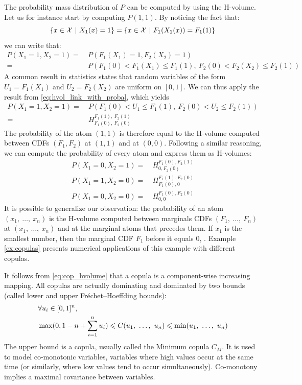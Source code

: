 \begin{example}
    The probability mass distribution of $P$ can be computed by using the H-volume. Let us for instance start by computing $P(1,1)$. By noticing the fact that:
    \begin{equation*}
        \{x\in\mathcal{X}~|~X_1(x)=1\}=\{x\in\mathcal{X}~|~F_1(X_1(x))=F_1(1)\}
    \end{equation*}
    we can write that:
    \begin{align*}
        P(X_1 = 1, X_2=1) =& ~P(F_1(X_1)= 1, F_2(X_2) = 1)\\
        =& ~P(F_1(0) < F_1(X_1)\leqslant F_1(1), ~F_2(0) < F_2(X_2)\leqslant F_2(1))
    \end{align*}
    A common result in statistics states that random variables of the form $U_1=F_1(X_1)$ and $U_2=F_2(X_2)$ are uniform on $[0,1]$. We can thus apply the result from \cref{eq:hvol_link_with_proba}, which yields
    \begin{align*}
        P(X_1 = 1, X_2=1) =& ~P(F_1(0) < U_1 \leqslant F_1(1), ~F_2(0) < U_2 \leqslant F_2(1))\\
        =& ~H^{F_1(1),~F_2(1)}_{F_1(0),~F_2(0)}
    \end{align*}
    The probability of the atom $(1,1)$ is therefore equal to the H-volume computed between CDFs $(F_1, F_2)$ at $(1, 1)$ and at $(0,0)$. Following a similar reasoning, we can compute the probability of every atom and express them as H-volumes:
    \begin{align*}
        P(X_1=0, X_2=1) =& ~H_{0, F_2(0)}^{F_1(0), F_2(1)}\\
        P(X_1=1, X_2=0) =& ~H_{F_1(0), 0}^{F_1(1), F_2(0)}\\
        P(X_1=0, X_2=0) =& ~H_{0,0}^{F_1(0), F_2(0)}
    \end{align*}
    It is possible to generalize our observation: the probability of an atom $(x_1,~\dots,~x_n)$ is the H-volume computed between marginals CDFs $(F_1,~\dots,~F_n)$ at $(x_1,~\dots,~x_n)$ and at the marginal atoms that precedes them. If $x_1$ is the smallest number, then the marginal CDF $F_1$ before it equals $0$, \etc.
    Example \ref{ex:copulas} presents numerical applications of this example with different copulas.
\end{example}

It follows from \eqref{eq:cop_hvolume} that a copula is a component-wise increasing mapping. All copulas are actually dominating and dominated by two bounds (called lower and upper Fréchet–Hoeffding bounds):
\begin{align}
    &\forall u_i \in [0,1]^n,\nonumber\\
    &\max(0, 1-n+\sum_{i=1}^n u_i) \leqslant C(u_1, ~\dots, ~ u_n) \leqslant \min(u_1, ~\dots, ~ u_n)
\end{align}
The upper bound is a copula, usually called the Minimum copula $C_M$. It is used to model co-monotonic variables, \ie variables where high values occur at the same time (or similarly, where low values tend to occur simultaneously). Co-monotony implies a maximal covariance between variables.

